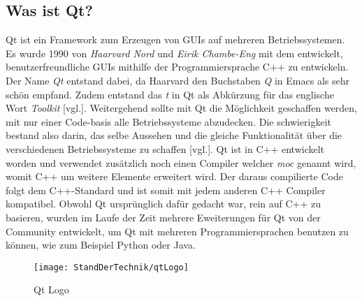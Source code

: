 \subsection{Was ist Qt?}
\label{subsec:WasIstQt}
Qt ist ein Framework zum Erzeugen von GUIs auf mehreren Betriebssystemen. Es wurde 1990 von
\emph{Haarvard Nord} und \emph{Eirik Chambe-Eng} mit dem entwickelt, benutzerfreundliche GUIs
mithilfe
der Programmiersprache C++ zu entwickeln. Der Name \emph{Qt}
entstand dabei, da Haarvard den Buchstaben \emph{Q} in Emacs als sehr schön empfand. Zudem
entstand das \emph{t} in Qt als
Abkürzung für das englische Wort \emph{Toolkit} \cite{qtStory}[vgl.].
\newline
\newline
Weitergehend sollte mit Qt die Möglichkeit geschaffen werden, mit nur einer Code-basis alle
Betriebssysteme abzudecken. Die schwierigkeit bestand also darin, das selbe Aussehen
und die gleiche Funktionalität über die verschiedenen Betriebssysteme zu
schaffen \cite{GettingStartedQt}[vgl.].
\newline
\newline
Qt ist in C++ entwickelt worden und verwendet zusätzlich noch einen Compiler welcher
\emph{\ac{moc}} genannt wird, womit C++ um weitere Elemente erweitert wird. Der daraus
compilierte Code folgt dem C++-Standard und ist somit mit jedem anderen C++ Compiler kompatibel.
Obwohl Qt ursprünglich dafür gedacht war, rein auf C++ zu basieren, wurden im Laufe der Zeit
mehrere Eweiterungen für Qt von der Community entwickelt, um Qt mit mehreren Programmiersprachen
benutzen zu können, wie zum Beispiel Python oder Java.
\begin{figure}[h]
    \centering
    \texttt{[image: StandDerTechnik/qtLogo]}
    \caption[Qt Logo]{Qt Logo}
    \label{img:qtLogo}
\end{figure}